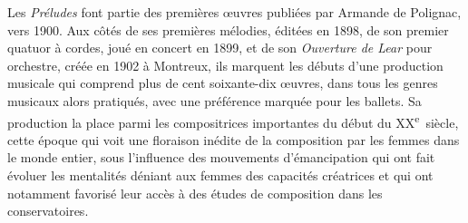 \documentclass[a4paper, 12pt]{book}
\begin{document}
Les \emph{Préludes} font partie des premières œuvres publiées par
Armande de Polignac, vers 1900. Aux côtés de ses premières mélodies,
éditées en 1898, de son premier quatuor à cordes, joué en concert en
1899, et de son \emph{Ouverture de Lear} pour orchestre, créée en 1902 à
Montreux, ils marquent les débuts d'une production musicale qui comprend
plus de cent soixante-dix œuvres, dans tous les genres musicaux alors
pratiqués, avec une préférence marquée pour les ballets. Sa production
la place parmi les compositrices importantes du début du
XX\textsuperscript{e}~siècle, cette époque qui voit une floraison
inédite de la composition par les femmes dans le monde entier, sous
l'influence des mouvements d'émancipation qui ont fait évoluer les
mentalités déniant aux femmes des capacités créatrices et qui ont
notamment favorisé leur accès à des études de composition dans les
conservatoires.
\end{document}
